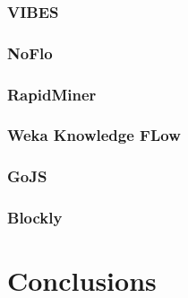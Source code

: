 \subsubsection{VIBES}

\subsubsection{NoFlo}

\subsubsection{RapidMiner}

\subsubsection{Weka Knowledge FLow}

\subsubsection{GoJS}

\subsubsection{Blockly}

\section{Conclusions}
